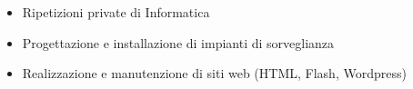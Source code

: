 %
%
%

\twocolumnsection
{ 
\vspace{0.5em}
\begin{itemize}
  \item Ripetizioni private di Informatica
  \item Progettazione e installazione di impianti di sorveglianza
  \item Realizzazione e manutenzione di siti web (HTML, Flash, Wordpress)
\end{itemize}
}
{ 
\begin{skills}
\end{skills}
}
